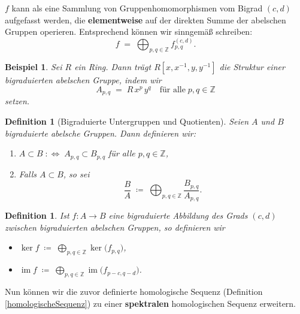 \documentclass[12pt]{article}
\numberwithin{conj}{section}
\newtheorem{definition}[conj]{Definition}
\newtheorem{example}[conj]{Beispiel}
\newcommand{\Z}{\mathbb{Z}}
\newcommand{\ima}{\operatorname{im}}
\begin{document}
$f$ kann als eine Sammlung von Gruppenhomomorphismen vom Bigrad $(c,d)$ aufgefasst werden, die \textbf{elementweise} auf der direkten Summe der abelschen Gruppen operieren. Entsprechend können wir sinngemäß schreiben:
\[
    f \;=\; \bigoplus_{p,q \in \Z} f^{(c,d)}_{p,q}.
\]

\begin{example}
    Sei $R$ ein Ring. Dann trägt $R[x,x^{-1},y,y^{-1}]$ die Struktur einer bigraduierten abelschen Gruppe, indem wir
    \[
        A_{p,q} \;=\; R\,x^p\,y^q
        \quad\text{für alle}\; p,q \in \Z
    \]
    setzen.
\end{example}

\begin{definition}[Bigraduierte Untergruppen und Quotienten]
    Seien $A$ und $B$ bigraduierte abelsche Gruppen. Dann definieren wir:
    \begin{enumerate}[nolistsep]
        \item $A \subset B \;\colon\Leftrightarrow\; A_{p,q} \subset B_{p,q}$ für alle $p,q \in \Z$,
        \item Falls $A \subset B$, so sei
              \[
                \displaystyle
                \frac{B}{A}
                \;\coloneqq\;
                \bigoplus_{p,q \in \Z}
                \frac{B_{p,q}}{A_{p,q}}.
              \]
    \end{enumerate}
\end{definition}

\begin{definition}
    Ist $f: A \to B$ eine bigraduierte Abbildung des Grads $(c,d)$ zwischen bigraduierten abelschen Gruppen, so definieren wir
    \begin{itemize}[nolistsep]
        \item $\displaystyle \ker f \;\coloneqq\; \bigoplus_{p,q \in \Z} \ker \bigl(f_{p,q}\bigr)$,
        \item $\displaystyle \ima f \;\coloneqq\; \bigoplus_{p,q \in \Z} \ima \bigl(f_{p-c,q-d}\bigr)$.
    \end{itemize}
\end{definition}

Nun können wir die zuvor definierte homologische Sequenz (Definition \ref{homologischeSequenz}) zu einer \textbf{spektralen} homologischen Sequenz erweitern.
\end{document}

